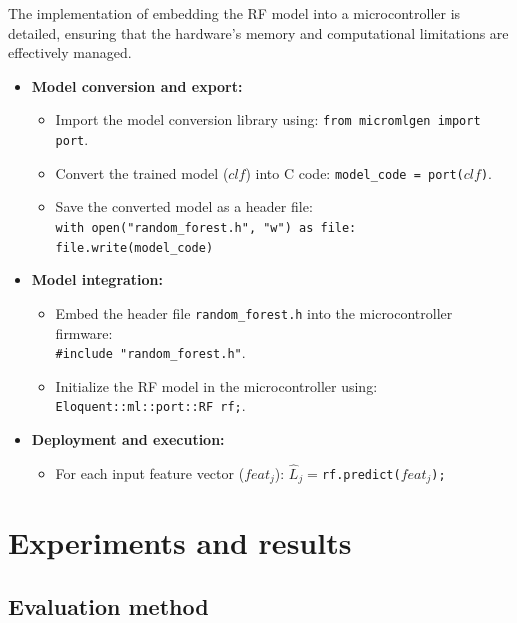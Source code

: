\documentclass[journal,twoside,web]{ieeecolor}
\begin{document}
The implementation of embedding the RF model into a microcontroller is detailed, ensuring that the hardware's memory and computational limitations are effectively managed.

\begin{itemize}
    \item \textbf{Model conversion and export:}
    \begin{itemize}
        \item Import the model conversion library using: \texttt{from micromlgen import port}.
        \item Convert the trained model ($clf$) into C code: \texttt{model\_code = port($clf$)}.
        \item Save the converted model as a header file:\\
            \texttt{with open("random\_forest.h", "w") as file:}
            \texttt{file.write(model\_code)}
    \end{itemize}

    \item \textbf{Model integration:}
    \begin{itemize}
        \item Embed the header file \texttt{random\_forest.h} into the microcontroller firmware: \\
        \texttt{\#include "random\_forest.h"}.
        \item Initialize the RF model in the microcontroller using: \\\texttt{Eloquent::ml::port::RF rf;}.
    \end{itemize}

    \item \textbf{Deployment and execution:}
    \begin{itemize}
        \item For each input feature vector (\( feat_j \)): 
          $\hat{L}_j=$\texttt{rf.predict($feat_j$);}
    \end{itemize}
\end{itemize}


\section{Experiments and results}
\subsection{Evaluation method}
\end{document}
